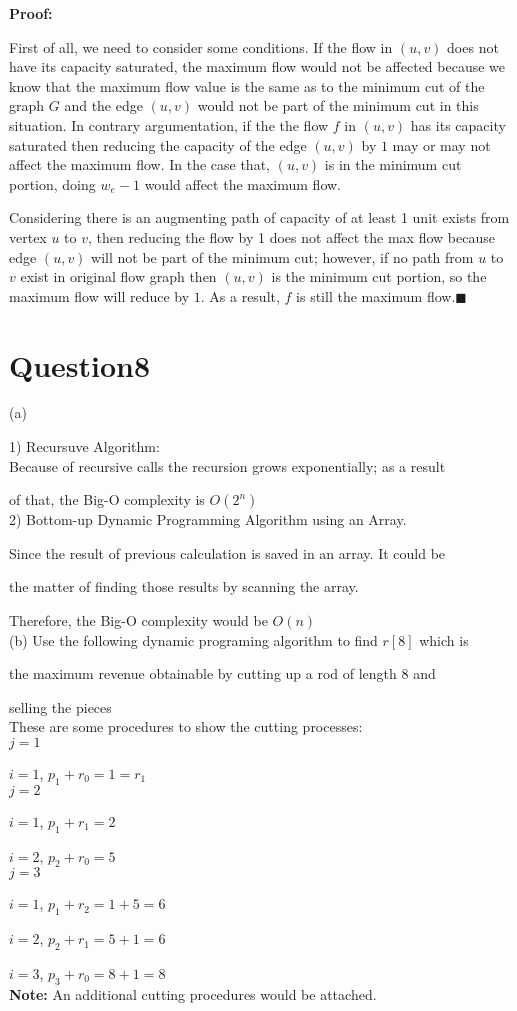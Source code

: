 \documentclass[12]{article}
\begin{document}
\textbf{Proof: }

First of all, we need to consider some conditions. If the flow in $(u, v)$ does not have its capacity saturated, the maximum flow would not be affected because we know that the maximum flow value is the same as to the minimum cut of the graph $G$ and the edge $(u,v)$ would not be part of the minimum cut in this situation. In contrary argumentation, if the  the flow $f$ in $(u,v)$ has its capacity saturated then reducing  the capacity of the edge $(u,v)$  by $1$ may or may not affect the maximum flow. In the case that, $(u,v)$  is in the minimum cut portion, doing $w_e - 1$  would affect the maximum flow.

Considering there is an augmenting path of capacity of at least 1 unit exists from vertex $u$ to $v$, then reducing the flow by 1 does not affect the max flow because  edge $(u,v)$ will not be part of the minimum cut; however, if no path from $u$ to $v$ exist in original flow graph then $(u,v)$ is the minimum cut portion, so the maximum flow will reduce by $1$.  As a result,  $f$ is still the maximum flow.$\blacksquare$

\section{Question8} 

(a)


1) Recursuve Algorithm: \\

Because of recursive calls the recursion grows exponentially; as a result

of that, the Big-O complexity is $O(2^n)$\\

2) Bottom-up Dynamic Programming Algorithm using an Array.

Since the result of previous calculation is saved in an array. It could be

the matter of finding those results by scanning the array.
 
Therefore, the Big-O complexity would be $O(n)$\\


(b) Use the following dynamic programing algorithm to find $r[8]$ which is
 
 the maximum revenue obtainable by cutting up a rod of length $8$ and 
 
 selling the pieces \\

These are some procedures to show the cutting  processes: \\

$j = 1$

$i  = 1$,  $p_1 +  r_0 = 1 = r_1$ \\

$j = 2$

$i = 1$,  $p_1 + r_1 = 2$

$i = 2$,  $p_2 + r_0 = 5$ \\

$j=3$

$i = 1$, $p_1 + r_2 = 1 + 5 = 6 $

$i = 2$, $p_2 + r_1 = 5 + 1 = 6$

$i = 3$, $p_3 + r_0 = 8 + 1 = 8$ \\

 
\textbf{Note:} An additional cutting procedures would  be attached.
 
\end{document}
